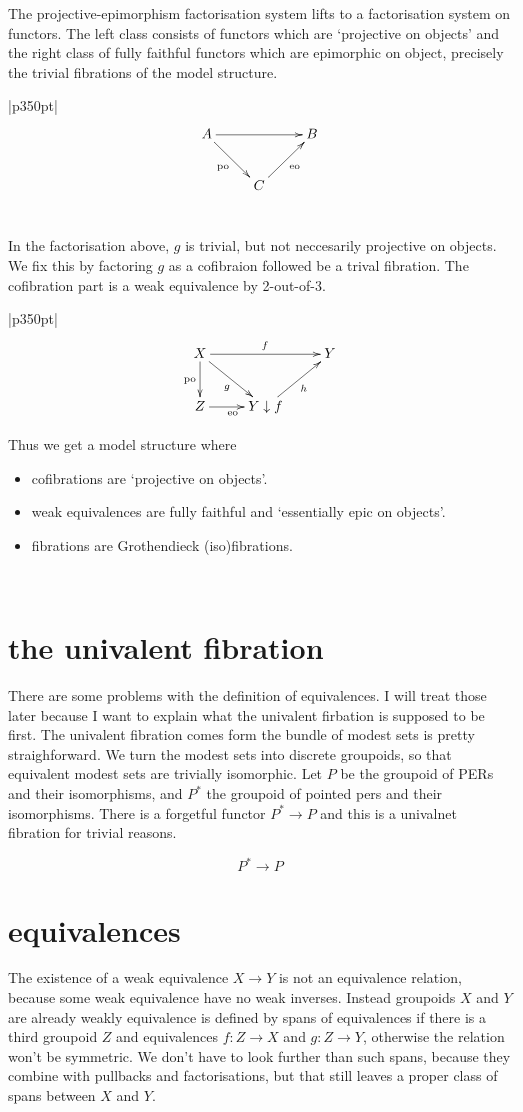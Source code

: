 \documentclass[12pt,a4paper]{article}
\theoremstyle{definition}
\newenvironment{blackboard}{\begin{tabular}{|p{350pt}|}\hline} {\\ \hline \end{tabular} }
\begin{document}
The projective-epimorphism factorisation system lifts to a factorisation system on functors. The left class consists of functors which are `projective on objects' and the right class of fully faithful functors which are epimorphic on object, precisely the trivial fibrations of the model structure.

\begin{blackboard}
\[ \xymatrix{
A\ar[rr]\ar[dr]_{\textrm{po}} && B\\
& C \ar[ur]_{\textrm{eo}}
}\]
\end{blackboard}

In the factorisation above, $g$ is trivial, but not neccesarily projective on objects. We fix this by factoring $g$ as a cofibraion followed be a trival fibration. The cofibration part is a weak equivalence by 2-out-of-3.

\begin{blackboard}
\[ \xymatrix{
X\ar[rr]^f\ar[dr]_g \ar[d]_{\textrm{po}} && Y\\
Z \ar[r]_{\textrm{eo}} & Y\downarrow f \ar[ur]_h
}\]

Thus we get a model structure where
\begin{itemize}
\item cofibrations are `projective on objects'.
\item weak equivalences are fully faithful and `essentially epic on objects'.
\item fibrations are Grothendieck (iso)fibrations.
\end{itemize}
\end{blackboard}

\section{the univalent fibration}
There are some problems with the definition of equivalences. I will treat those later because I want to explain what the univalent firbation is supposed to be first. The univalent fibration comes form the bundle of modest sets is pretty straighforward. We turn the modest sets into discrete groupoids, so that equivalent modest sets are trivially isomorphic.
Let $P$ be the groupoid of PERs and their isomorphisms, and $P^*$ the groupoid of pointed pers and their isomorphisms. There is a forgetful functor $P^*\to P$ and this is a univalnet fibration for trivial reasons.

\[ P^* \to P \]

\section{equivalences}
The existence of a weak equivalence $X\to Y$ is not an equivalence relation, because some weak equivalence have no weak inverses. Instead groupoids $X$ and $Y$ are already weakly equivalence is defined by spans of equivalences if there is a third groupoid $Z$ and equivalences $f:Z\to X$ and $g:Z\to Y$, otherwise the relation won't be symmetric. We don't have to look further than such spans, because they combine with pullbacks and factorisations, but that still leaves a proper class of spans between $X$ and $Y$.
\end{document}
